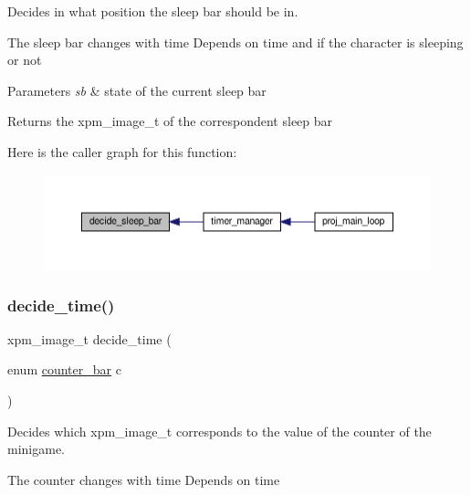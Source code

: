 Decides in what position the sleep bar should be in. 

The sleep bar changes with time Depends on time and if the character is sleeping or not


\begin{DoxyParams}{Parameters}
{\em sb} & state of the current sleep bar\\
\hline
\end{DoxyParams}
\begin{DoxyReturn}{Returns}
the xpm\+\_\+image\+\_\+t of the correspondent sleep bar 
\end{DoxyReturn}
Here is the caller graph for this function\+:
\nopagebreak
\begin{figure}[H]
\begin{center}
\leavevmode
\includegraphics[width=350pt]{group__loading__xpms_gafe3e8d1842749e3b8831f03eaff01c99_icgraph}
\end{center}
\end{figure}
\mbox{\label{group__loading__xpms_ga5dbbff5de875a1305fdf7ed265fc73c8}} 
\subsubsection{\texorpdfstring{decide\+\_\+time()}{decide\_time()}}
{\footnotesize\ttfamily xpm\+\_\+image\+\_\+t decide\+\_\+time (\begin{DoxyParamCaption}\item[{enum \hyperlink{group__types_gad48fe05a3e5df355707b5a3fd6cf9d8e}{counter\+\_\+bar}}]{c }\end{DoxyParamCaption})}



Decides which xpm\+\_\+image\+\_\+t corresponds to the value of the counter of the minigame. 

The counter changes with time Depends on time


